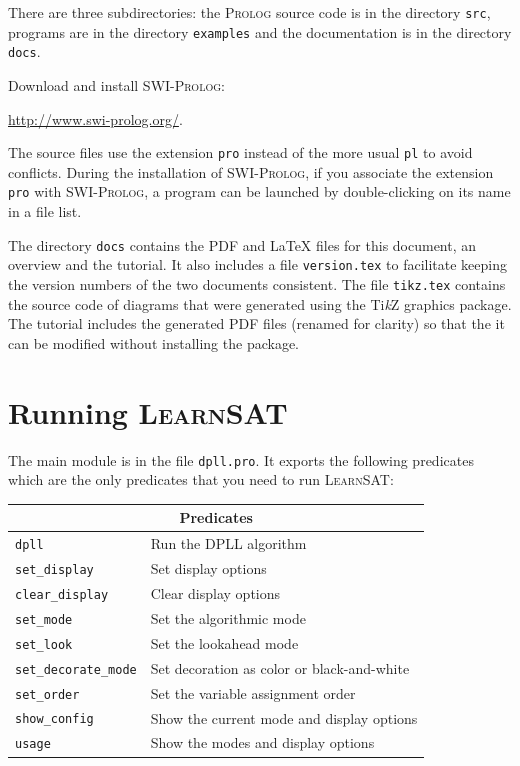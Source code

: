 \documentclass[11pt]{article}
\newcommand*{\p}[1]{\textup{\texttt{#1}}}
\newcommand*{\ls}{\textsc{LearnSAT}}
\newcommand*{\pl}{\textsc{Prolog}}
\newcommand*{\sw}{\textsc{SWI-Prolog}}
\begin{document}
There are three subdirectories: the \pl{} source code is in the directory \p{src}, programs are in the directory \p{examples} and the documentation is in the directory \p{docs}.

Download and install \sw{}:
\begin{center}
\url{http://www.swi-prolog.org/}.
\end{center}

The source files use the extension \p{pro} instead of the more usual
\p{pl} to avoid conflicts. During the installation
of \sw{}, if you associate the extension \p{pro} with \sw{}, a
program can be launched by double-clicking on its name in a file list. 

The directory \p{docs} contains the PDF and \LaTeX{} files for this document, an overview and the tutorial. It also includes a file \p{version.tex} to facilitate keeping the version numbers of the two documents consistent. The file \p{tikz.tex} contains the source code of diagrams that were generated using the Ti\textit{k}Z graphics package. The tutorial includes the generated PDF files (renamed for clarity) so that the it can be modified without installing the package.


\section{Running \ls}

The main module is in the file \p{dpll.pro}. It exports the following
predicates which are the only predicates that you need to run \ls{}:

\begin{center}
\begin{tabular}{|l|l|}
\hline
\multicolumn{2}{|c|}{\textbf{\large Predicates}}\\
\hline
\p{dpll}&Run the DPLL algorithm\\
\p{set\_display}&Set display options\\
\p{clear\_display}&Clear display options\\
\p{set\_mode}&Set the algorithmic mode\\
\p{set\_look}&Set the lookahead mode\\
\p{set\_decorate\_mode} & Set decoration as color or black-and-white\\ 
\p{set\_order}&Set the variable assignment order\\
\p{show\_config}&Show the current mode and display options\\
\p{usage}&Show the modes and display options \\
\hline
\end{tabular}
\end{center}
\end{document}
